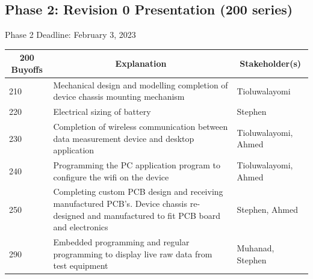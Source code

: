 \documentclass[12pt]{article}
\begin{document}
\newpage
\noindent
\subsection{Phase 2: Revision 0 Presentation (200 series)}
Phase 2 Deadline: February 3, 2023\\

\begin{table}[H]
  \centering
  \begin{tabular}{|p{2cm}|p{10cm}|p{2cm}|}
  \hline
  \multicolumn{1}{|c|}{\textbf{200 Buyoffs}} & \multicolumn{1}{c|}{\textbf{Explanation}} & \multicolumn{1}{|c|}{\textbf{Stakeholder(s)}}
  \\ \hline
  210
  & Mechanical design and modelling completion of device chassis mounting mechanism
  & Tioluwalayomi
  \newline                                
  \\ \hline

  220
  & Electrical sizing of battery
  & Stephen
  \newline                                
  \\ \hline

  230                              
  & Completion of wireless communication between data measurement device and desktop application 
  & Tioluwalayomi, Ahmed
  \newline                                
  \\ \hline


  240                          
  & Programming the PC application program to configure the wifi on the device
  & Tioluwalayomi, Ahmed
  \newline                                
  \\ \hline

  250                          
  & Completing custom PCB design and receiving manufactured PCB's. Device chassis re-designed and manufactured to fit PCB board and electronics
  & Stephen, Ahmed
  \newline                                
  \\ \hline

  290                                
  & Embedded programming and regular programming to display live raw data from test equipment
  & Muhanad, Stephen 
  \newline                            
  \\ \hline

  \end{tabular}
\end{table}
\newpage
\end{document}
